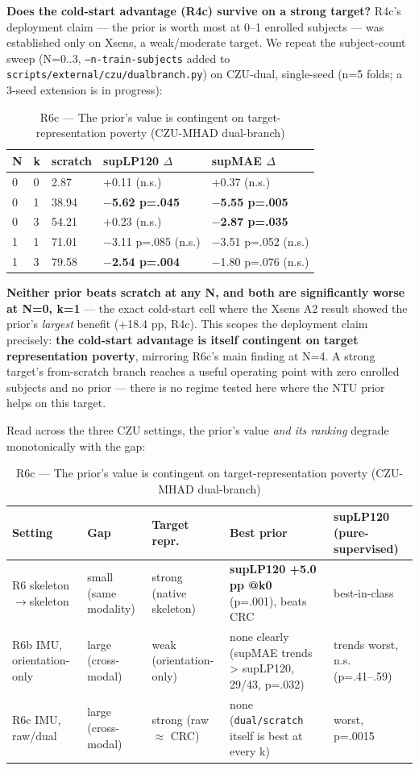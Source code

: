 \textbf{Does the cold-start advantage (R4c) survive on a strong target?} R4c's deployment claim --- the prior is worth most at 0--1 enrolled subjects --- was established only on Xsens, a weak/moderate target. We repeat the subject-count sweep (N=0..3, \texttt{--n-train-subjects} added to \texttt{scripts/external/czu/dualbranch.py}) on CZU-dual, single-seed (n=5 folds; a 3-seed extension is in progress):

\begin{table}[!t]
\centering
\caption{R6c --- The prior's value is contingent on target-representation poverty (CZU-MHAD dual-branch)}
\small
\begin{tabular}{lllll}
\toprule
N & k & scratch & supLP120 $\Delta$ & supMAE $\Delta$ \\
\midrule
0 & 0 & 2.87 & +0.11 (n.s.) & +0.37 (n.s.) \\
0 & 1 & 38.94 & \textbf{$-$5.62 p=.045} & \textbf{$-$5.55 p=.005} \\
0 & 3 & 54.21 & +0.23 (n.s.) & \textbf{$-$2.87 p=.035} \\
1 & 1 & 71.01 & $-$3.11 p=.085 (n.s.) & $-$3.51 p=.052 (n.s.) \\
1 & 3 & 79.58 & \textbf{$-$2.54 p=.004} & $-$1.80 p=.076 (n.s.) \\
\bottomrule
\end{tabular}
\end{table}

\textbf{Neither prior beats scratch at any N, and both are significantly worse at N=0, k=1} --- the exact cold-start cell where the Xsens A2 result showed the prior's \textit{largest} benefit (+18.4 pp, R4c). This scopes the deployment claim precisely: \textbf{the cold-start advantage is itself contingent on target representation poverty}, mirroring R6c's main finding at N=4. A strong target's from-scratch branch reaches a useful operating point with zero enrolled subjects and no prior --- there is no regime tested here where the NTU prior helps on this target.

Read across the three CZU settings, the prior's value \textit{and its ranking} degrade monotonically with the gap:

\begin{table}[!t]
\centering
\caption{R6c --- The prior's value is contingent on target-representation poverty (CZU-MHAD dual-branch)}
\small
\begin{tabular}{lllll}
\toprule
Setting & Gap & Target repr. & Best prior & supLP120 (pure-supervised) \\
\midrule
R6 skeleton$\rightarrow$skeleton & small (same modality) & strong (native skeleton) & \textbf{supLP120 +5.0 pp @k0} (p=.001), beats CRC & best-in-class \\
R6b IMU, orientation-only & large (cross-modal) & weak (orientation-only) & none clearly (supMAE trends > supLP120, 29/43, p=.032) & trends worst, n.s. (p=.41--.59) \\
R6c IMU, raw/dual & large (cross-modal) & strong (raw $\approx$ CRC) & none (\texttt{dual/scratch} itself is best at every k) & worst, p=.0015 \\
\bottomrule
\end{tabular}
\end{table}

